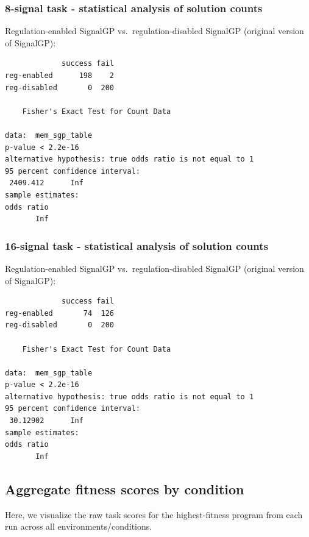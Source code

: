 \documentclass[
]{book}
\begin{document}
\hypertarget{signal-task---statistical-analysis-of-solution-counts-2}{%
\subsubsection{8-signal task - statistical analysis of solution counts}\label{signal-task---statistical-analysis-of-solution-counts-2}}

Regulation-enabled SignalGP vs.~regulation-disabled SignalGP (original version of SignalGP):

\begin{verbatim}
             success fail
reg-enabled      198    2
reg-disabled       0  200

    Fisher's Exact Test for Count Data

data:  mem_sgp_table
p-value < 2.2e-16
alternative hypothesis: true odds ratio is not equal to 1
95 percent confidence interval:
 2409.412      Inf
sample estimates:
odds ratio 
       Inf 
\end{verbatim}

\hypertarget{signal-task---statistical-analysis-of-solution-counts-3}{%
\subsubsection{16-signal task - statistical analysis of solution counts}\label{signal-task---statistical-analysis-of-solution-counts-3}}

Regulation-enabled SignalGP vs.~regulation-disabled SignalGP (original version of SignalGP):

\begin{verbatim}
             success fail
reg-enabled       74  126
reg-disabled       0  200

    Fisher's Exact Test for Count Data

data:  mem_sgp_table
p-value < 2.2e-16
alternative hypothesis: true odds ratio is not equal to 1
95 percent confidence interval:
 30.12902      Inf
sample estimates:
odds ratio 
       Inf 
\end{verbatim}

\hypertarget{aggregate-fitness-scores-by-condition}{%
\subsection{Aggregate fitness scores by condition}\label{aggregate-fitness-scores-by-condition}}

Here, we visualize the raw task scores for the highest-fitness program from each run across all environments/conditions.
\end{document}
